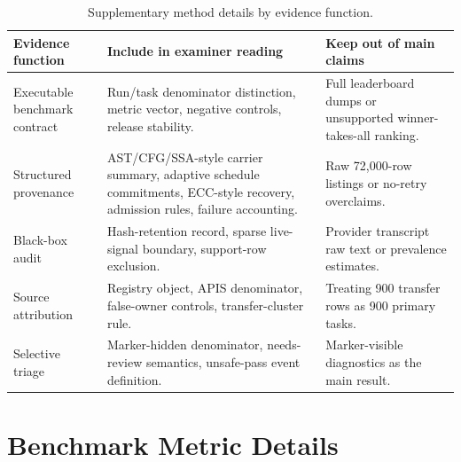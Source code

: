 \begin{table}[htbp]
\centering
\caption{Supplementary method details by evidence function.}
\label{tab:supplementary-method-details}
\tighttable
\begin{tabularx}{\textwidth}{@{}L{2.25cm}YY@{}}
\toprule
Evidence function & Include in examiner reading & Keep out of main claims \\
\midrule
Executable benchmark contract & Run/task denominator distinction, metric vector, negative controls, release stability. & Full leaderboard dumps or unsupported winner-takes-all ranking. \\
Structured provenance & AST/CFG/SSA-style carrier summary, adaptive schedule commitments, ECC-style recovery, admission rules, failure accounting. & Raw 72,000-row listings or no-retry overclaims. \\
Black-box audit & Hash-retention record, sparse live-signal boundary, support-row exclusion. & Provider transcript raw text or prevalence estimates. \\
Source attribution & Registry object, APIS denominator, false-owner controls, transfer-cluster rule. & Treating 900 transfer rows as 900 primary tasks. \\
Selective triage & Marker-hidden denominator, needs-review semantics, unsafe-pass event definition. & Marker-visible diagnostics as the main result. \\
\bottomrule
\end{tabularx}
\end{table}
\FloatBarrier

\section{Benchmark Metric Details}

